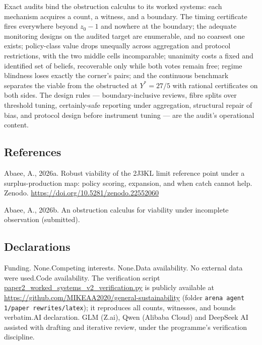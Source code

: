 \documentclass[10pt,twocolumn]{article}
\theoremstyle{definition}
\begin{document}
Exact audits bind the obstruction calculus to its worked systems: each
mechanism acquires a count, a witness, and a boundary. The timing
certificate fires everywhere beyond \(z_0 - 1\) and nowhere at the
boundary; the adequate monitoring designs on the audited target are
enumerable, and no coarsest one exists; policy-class value drops
unequally across aggregation and protocol restrictions, with the two
middle cells incomparable; unanimity costs a fixed and identified set
of beliefs, recoverable only while both votes remain free; regime
blindness loses exactly the corner's pairs; and the continuous
benchmark separates the viable from the obstructed at \(Y^{*} = 27/5\)
with rational certificates on both sides. The design rules ---
boundary-inclusive reviews, fibre splits over threshold tuning,
certainly-safe reporting under aggregation, structural repair of bias,
and protocol design before instrument tuning --- are the audit's
operational content.

\subsection*{References}

Abaee, A., 2026a. Robust viability of the 2J3KL limit reference point
under a surplus-production map: policy scoring, expansion, and when
catch cannot help. Zenodo.
\url{https://doi.org/10.5281/zenodo.22552060}

Abaee, A., 2026b. An obstruction calculus for viability under
incomplete observation (submitted).

\subsection*{Declarations}

Funding. None.\quad Competing interests. None.\quad Data availability.
No external data were used.\quad Code availability. The verification
script \url{paper2_worked_systems_v2_verification.py} is publicly
available at \url{https://github.com/MIKEAA2020/general-sustainability}
(folder \texttt{arena agent 1/paper rewrites/latex}); it reproduces all
counts, witnesses, and bounds verbatim.\quad AI declaration. GLM
(Z.ai), Qwen (Alibaba Cloud) and DeepSeek AI assisted with drafting and
iterative review, under the programme's verification discipline.
\end{document}
